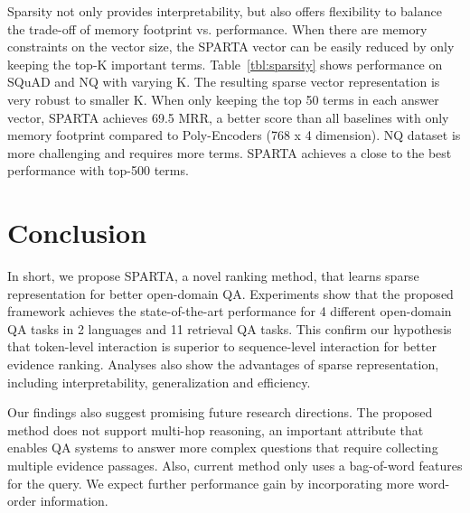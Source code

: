 \documentclass[11pt,a4paper]{article}
\begin{document}
Sparsity not only provides interpretability, but also offers flexibility to balance the trade-off of memory footprint vs. performance. When there are memory constraints on the vector size, the SPARTA vector can be easily reduced by only keeping the top-K important terms. Table~\ref{tbl:sparsity} shows performance on SQuAD and NQ with varying K. The resulting sparse vector representation is very robust to smaller K. When only keeping the top 50 terms in each answer vector, SPARTA achieves 69.5 MRR, a better score than all baselines with only  memory footprint compared to Poly-Encoders (768 x 4 dimension). NQ dataset is more challenging and requires more terms. SPARTA achieves a close to the best performance with top-500 terms. 
 




\section{Conclusion}
In short, we propose SPARTA, a novel ranking method, that learns sparse representation for better open-domain QA. Experiments show that the proposed framework achieves the state-of-the-art performance for 4 different open-domain QA tasks in 2 languages and 11 retrieval QA tasks. This confirm our hypothesis that token-level interaction is superior to sequence-level interaction for better evidence ranking. Analyses also show the advantages of sparse representation, including interpretability, generalization and efficiency.

Our findings also suggest promising future research directions. The proposed method does not support multi-hop reasoning, an important attribute that enables QA systems to answer more complex questions that require collecting multiple evidence passages. Also, current method only uses a bag-of-word features for the query. We expect further performance gain by incorporating more word-order information.

\newpage



\appendix
\end{document}
